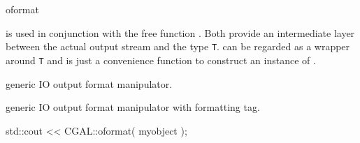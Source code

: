 \begin{ccRefFunction}{oformat}

 is used in conjunction with the free function . Both provide an intermediate layer between the actual output stream and the type \texttt{T}.  can be regarded as a wrapper around \texttt{T} and  is just a convenience function to construct an instance of .

           {generic IO output format manipulator.}

           {generic IO output format manipulator with formatting tag.}

\ccExample
\begin{ccExampleCode}
std::cout << CGAL::oformat( myobject );
\end{ccExampleCode}


\end{ccRefFunction}